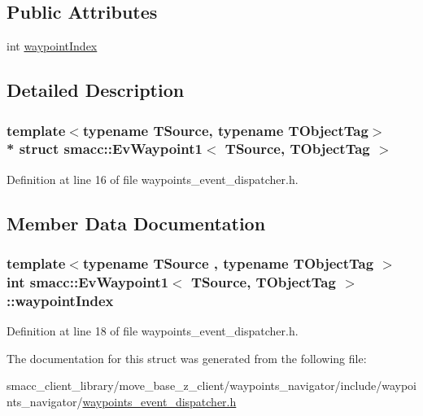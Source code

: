 \subsection*{Public Attributes}
\begin{DoxyCompactItemize}
\item 
int \hyperlink{structsmacc_1_1EvWaypoint1_a2ba7d933c774b4815f8e7303ccdfc039}{waypoint\+Index}
\end{DoxyCompactItemize}


\subsection{Detailed Description}
\subsubsection*{template$<$typename T\+Source, typename T\+Object\+Tag$>$\\*
struct smacc\+::\+Ev\+Waypoint1$<$ T\+Source, T\+Object\+Tag $>$}



Definition at line 16 of file waypoints\+\_\+event\+\_\+dispatcher.\+h.



\subsection{Member Data Documentation}
\subsubsection[{\texorpdfstring{waypoint\+Index}{waypointIndex}}]{\setlength{\rightskip}{0pt plus 5cm}template$<$typename T\+Source , typename T\+Object\+Tag $>$ int {\bf smacc\+::\+Ev\+Waypoint1}$<$ T\+Source, T\+Object\+Tag $>$\+::waypoint\+Index}\hypertarget{structsmacc_1_1EvWaypoint1_a2ba7d933c774b4815f8e7303ccdfc039}{}\label{structsmacc_1_1EvWaypoint1_a2ba7d933c774b4815f8e7303ccdfc039}


Definition at line 18 of file waypoints\+\_\+event\+\_\+dispatcher.\+h.



The documentation for this struct was generated from the following file\+:\begin{DoxyCompactItemize}
\item 
smacc\+\_\+client\+\_\+library/move\+\_\+base\+\_\+z\+\_\+client/waypoints\+\_\+navigator/include/waypoints\+\_\+navigator/\hyperlink{waypoints__event__dispatcher_8h}{waypoints\+\_\+event\+\_\+dispatcher.\+h}\end{DoxyCompactItemize}
